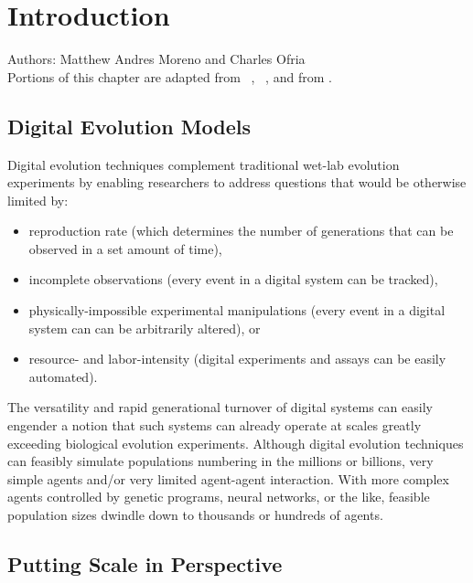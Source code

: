 \chapter{Introduction}
\label{ch:introduction}

\noindent
Authors: Matthew Andres Moreno and Charles Ofria \\
Portions of this chapter are adapted from ~\citep{moreno2019toward}, ~\citep{moreno2020practical}, and from \citep{moreno2020profiling}.

\section{Digital Evolution Models}

Digital evolution techniques complement traditional wet-lab evolution experiments by enabling researchers to address questions that would be otherwise limited by:
\begin{itemize}
\item reproduction rate (which determines the number of generations that can be observed in a set amount of time),
\item incomplete observations (every event in a digital system can be tracked),
\item physically-impossible experimental manipulations (every event in a digital system can can be arbitrarily altered), or
\item resource- and labor-intensity (digital experiments and assays can be easily automated).
\end{itemize}
The versatility and rapid generational turnover of digital systems can easily engender a notion that such systems can already operate at scales greatly exceeding biological evolution experiments.
Although digital evolution techniques can feasibly simulate populations numbering in the millions or billions, very simple agents and/or very limited agent-agent interaction.
With more complex agents controlled by genetic programs, neural networks, or the like, feasible population sizes dwindle down to thousands or hundreds of agents.

\section{Putting Scale in Perspective}

